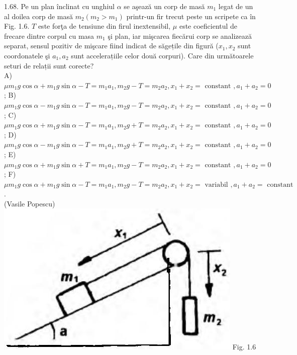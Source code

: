 \documentclass[10pt]{article}
\begin{document}
1.68. Pe un plan înclinat cu unghiul $\alpha$ se aşează un corp de masă $m_{1}$ legat de un al doilea corp de masă $m_{2} \left(m_{2}>m_{1}\right)$ printr-un fir trecut peste un scripete ca în Fig. 1.6. $T$ este forţa de tensiune din firul inextensibil, $\mu$ este coeficientul de frecare dintre corpul cu masa $m_{1}$ şi plan, iar mişcarea fiecărui corp se analizează separat, sensul pozitiv de mişcare fiind indicat de săgețile din figură ($x_{1}, x_{2}$ sunt coordonatele şi $a_{1}, a_{2}$ sunt accelerațiile celor două corpuri). Care din următoarele seturi de relații sunt corecte?\\ A) $\mu m_{1} g \cos \alpha+m_{1} g \sin \alpha-T=m_{1} a_{1}, m_{2} g-T=m_{2} a_{2}, x_{1}+x_{2}=\text{ constant }, a_{1}+a_{2}=0$; B) $\mu m_{1} g \cos \alpha-m_{1} g \sin \alpha-T=m_{1} a_{1}, m_{2} g-T=m_{2} a_{2}, x_{1}+x_{2}=\text{ constant }, a_{1}+a_{2}=0$; C) $\mu m_{1} g \cos \alpha+m_{1} g \sin \alpha-T=m_{1} a_{1}, m_{2} g+T=m_{2} a_{2}, x_{1}+x_{2}=\text{ constant }, a_{1}+a_{2}=0$; D) $\mu m_{1} g \cos \alpha-m_{1} g \sin \alpha-T=m_{1} a_{1}, m_{2} g+T=m_{2} a_{2}, x_{1}+x_{2}=\text{ constant }, a_{1}+a_{2}=0$; E) $\mu m_{1} g \cos \alpha+m_{1} g \sin \alpha+T=m_{1} a_{1}, m_{2} g-T=m_{2} a_{2}, x_{1}+x_{2}=\text{ constant }, a_{1}+a_{2}=0$; F) $\mu m_{1} g \cos \alpha+m_{1} g \sin \alpha-T=m_{1} a_{1}, m_{2} g-T=m_{2} a_{2}, x_{1}+x_{2}=\text{ variabil }, a_{1}+a_{2}=\text{ constant }$.\\ (Vasile Popescu)\\ \includegraphics[max width=\textwidth, center]{2025_07_01_5b3ff9fa0d508c8e9f17g-017} Fig. 1.6\\
\end{document}

